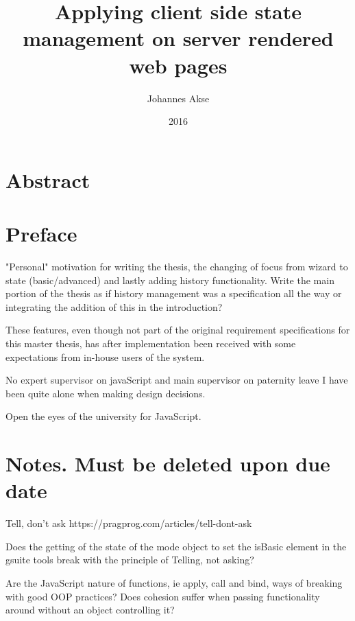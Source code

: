 \documentclass[english]{ifimaster}
\title{Applying client side state management on server rendered web pages}
\subtitle{}
\author{Johannes Akse}
\date{2016}
\begin{document}
\maketitle{}
\chapter*{Abstract}

\tableofcontents
\nocite{*}

\chapter*{Preface}
"Personal" motivation for writing the thesis, the changing of focus from wizard to state (basic/advanced) and lastly adding history functionality. Write the main portion of the thesis as if history management was a specification all the way or integrating the addition of this in the introduction?

These features, even though not part of the original requirement specifications for this master thesis, has after implementation been received with some expectations from in-house users of the system. 

No expert supervisor on javaScript and main supervisor on paternity leave I have been quite alone when making design decisions. 

Open the eyes of the university for JavaScript.
\chapter*{Notes. Must be deleted upon due date}

 Tell, don't ask https://pragprog.com/articles/tell-dont-ask

 Does the getting of the state of the mode object to set the isBasic element in the gsuite tools break with the principle of Telling, not asking?

 Are the JavaScript nature of functions, ie apply, call and bind, ways of breaking with good OOP practices? Does cohesion suffer when passing functionality around without an object controlling it?

\end{document}
